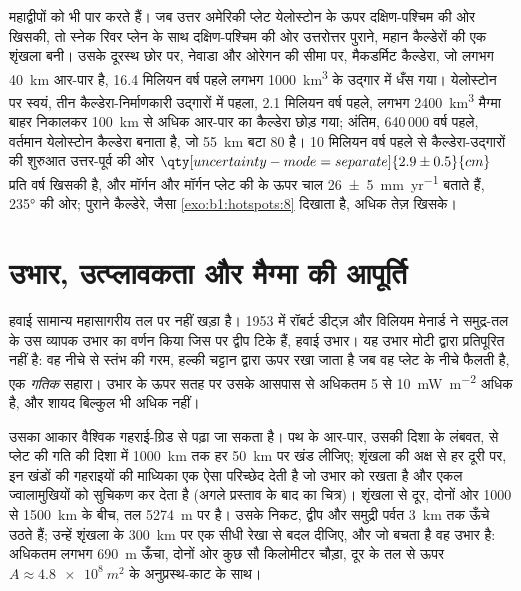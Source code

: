  महाद्वीपों को भी पार करते हैं। जब उत्तर अमेरिकी प्लेट येलोस्टोन  के ऊपर दक्षिण-पश्चिम की ओर खिसकी, तो स्नेक रिवर प्लेन के साथ दक्षिण-पश्चिम की ओर उत्तरोत्तर पुराने, महान कैल्डेरों की एक शृंखला बनी। उसके दूरस्थ छोर पर, नेवाडा और ओरेगन की सीमा पर, मैकडर्मिट कैल्डेरा, जो लगभग \qty{40}{km} आर-पार है, 16.4 मिलियन वर्ष पहले लगभग \qty{1000}{km^3} के उद्गार में धँस गया। येलोस्टोन पर स्वयं, तीन कैल्डेरा-निर्माणकारी उद्गारों में पहला, 2.1 मिलियन वर्ष पहले, लगभग \qty{2400}{km^3} मैग्मा बाहर निकालकर \qty{100}{km} से अधिक आर-पार का कैल्डेरा छोड़ गया; अंतिम, 640\,000 वर्ष पहले, वर्तमान येलोस्टोन कैल्डेरा बनाता है, जो \qty{55}{km} बटा 80 है। 10 मिलियन वर्ष पहले से कैल्डेरा-उद्गारों की शुरुआत उत्तर-पूर्व की ओर $\qty[uncertainty-mode=separate]{2.9 \pm 0.5}{cm}$ प्रति वर्ष खिसकी है, और मॉर्गन और मॉर्गन प्लेट की  के ऊपर चाल \qty[uncertainty-mode=separate]{26 \pm 5}{mm.yr^{-1}} बताते हैं, \ang{235} की ओर; पुराने कैल्डेरे, जैसा \cref{exo:b1:hotspots:8} दिखाता है, अधिक तेज़ खिसके।

\section{उभार, उत्प्लावकता और मैग्मा की आपूर्ति}\label{sec:b1:hotspots:swells}

हवाई सामान्य महासागरीय तल पर नहीं खड़ा है। 1953 में रॉबर्ट डीट्ज़ और विलियम मेनार्ड ने समुद्र-तल के उस व्यापक उभार का वर्णन किया जिस पर द्वीप टिके हैं, हवाई उभार। यह उभार मोटी  द्वारा प्रतिपूरित नहीं है: वह नीचे से स्तंभ की गरम, हल्की चट्टान द्वारा ऊपर रखा जाता है जब वह प्लेट के नीचे फैलती है, एक \emph{गतिक} सहारा। उभार के ऊपर सतह पर  उसके आसपास से अधिकतम 5 से \qty{10}{mW.m^{-2}} अधिक है, और शायद बिल्कुल भी अधिक नहीं।

उसका आकार वैश्विक गहराई-ग्रिड से पढ़ा जा सकता है। पथ के आर-पार, उसकी दिशा के लंबवत,  से प्लेट की गति की दिशा में \qty{1000}{km} तक हर \qty{50}{km} पर खंड लीजिए; शृंखला की अक्ष से हर दूरी पर, इन खंडों की गहराइयों की माध्यिका एक ऐसा परिच्छेद देती है जो उभार को रखता है और एकल ज्वालामुखियों को सुचिकण कर देता है (अगले प्रस्ताव के बाद का चित्र)। शृंखला से दूर, दोनों ओर 1000 से \qty{1500}{km} के बीच, तल \qty{5274}{m} पर है। उसके निकट, द्वीप और समुद्री पर्वत \qty{3}{km} तक ऊँचे उठते हैं; उन्हें शृंखला के \qty{300}{km} पर एक सीधी रेखा से बदल दीजिए, और जो बचता है वह उभार है: अधिकतम लगभग \qty{690}{m} ऊँचा, दोनों ओर कुछ सौ किलोमीटर चौड़ा, दूर के तल से ऊपर $A \approx \qty{4.8e8}{m^2}$ के अनुप्रस्थ-काट के साथ।


